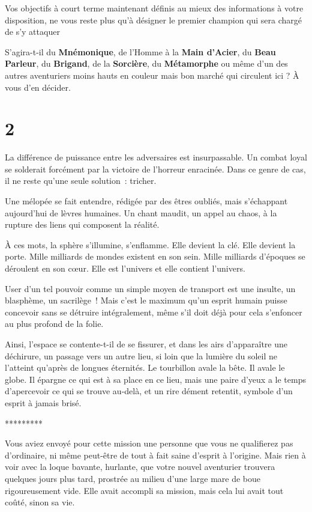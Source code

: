 \documentclass{report}
\newcommand{\gsection}[1]{
    \section{#1}
    \label{section-#1}
}
\newcommand{\ellipse}{
    \begin{center}
        *********
    \end{center}
}
\newcommand{\hero}[1]{\textbf{#1}}
\begin{document}
Vos objectifs à court terme maintenant définis au mieux des informations à votre disposition, ne vous reste plus qu'à désigner le premier champion qui sera chargé de s'y attaquer

S'agira-t-il du \hero{Mnémonique}, de l’Homme à la \hero{Main d’Acier}, du \hero{Beau Parleur}, du \hero{Brigand}, de la \hero{Sorcière}, du \hero{Métamorphe} ou même d'un des autres aventuriers moins hauts en couleur mais bon marché qui circulent ici ? À vous d'en décider.

\gsection{2}

La différence de puissance entre les adversaires est insurpassable. Un combat loyal se solderait forcément par la victoire de l'horreur enracinée. Dans ce genre de cas, il ne reste qu'une seule solution : tricher.

Une mélopée se fait entendre, rédigée par des êtres oubliés, mais s'échappant aujourd'hui de lèvres humaines. Un chant maudit, un appel au chaos, à la rupture des liens qui composent la réalité.

À ces mots, la sphère s'illumine, s'enflamme. Elle devient la clé. Elle devient la porte. Mille milliards de mondes existent en son sein. Mille milliards d'époques se déroulent en son cœur. Elle est l'univers et elle contient l'univers.

User d'un tel pouvoir comme un simple moyen de transport est une insulte, un blasphème, un sacrilège ! Mais c'est le maximum qu'un esprit humain puisse concevoir sans se détruire intégralement, même s'il doit déjà pour cela s'enfoncer au plus profond de la folie.

Ainsi, l'espace se contente-t-il de se fissurer, et dans les airs d'apparaître une déchirure, un passage vers un autre lieu, si loin que la lumière du soleil ne l'atteint qu'après de longues éternités. Le tourbillon avale la bête. Il avale le globe. Il épargne ce qui est à sa place en ce lieu, mais une paire d'yeux a le temps d'apercevoir ce qui se trouve au-delà, et un rire dément retentit, symbole d'un esprit à jamais brisé.

\ellipse

Vous aviez envoyé pour cette mission une personne que vous ne qualifierez pas d'ordinaire, ni même peut-être de tout à fait saine d'esprit à l'origine. Mais rien à voir avec la loque bavante, hurlante, que votre nouvel aventurier trouvera quelques jours plus tard, prostrée au milieu d'une large mare de boue rigoureusement vide. Elle avait accompli sa mission, mais cela lui avait tout coûté, sinon sa vie.
\end{document}
